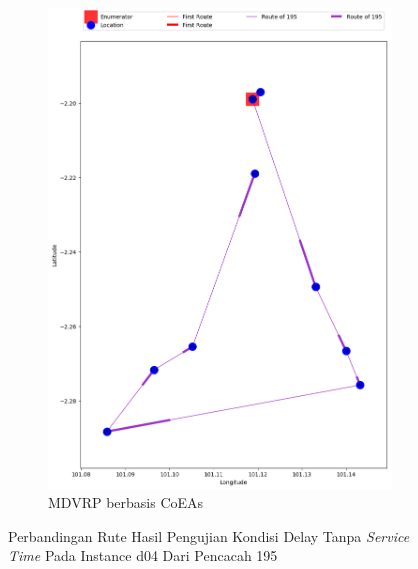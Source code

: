 \begin{figure}[H]
	\centering
	\begin{subfigure}[t]{\textwidth}
		\centering
		\includegraphics[width=\textwidth]{Resources/Images/delayed_4/real_m15_n100_delayed_4_195_coes}
		\caption{MDVRP berbasis CoEAs}
		\label{fig:real_m15_n100_delayed_4_195_coes}
	\end{subfigure}
	\caption{Perbandingan Rute Hasil Pengujian Kondisi Delay Tanpa \textit{Service Time} Pada Instance d04 Dari Pencacah 195}
	\label{fig:real_m15_n100_delayed_4_195}
\end{figure}


